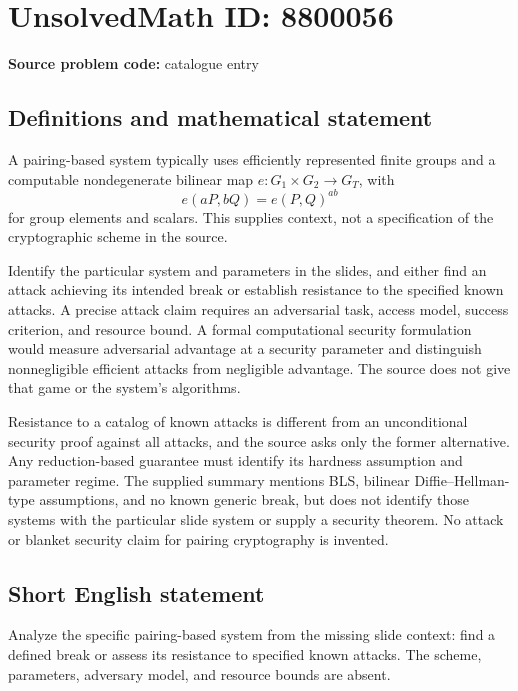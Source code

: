 \documentclass[11pt]{article}
\begin{document}
\section*{UnsolvedMath ID: 8800056}
\textbf{Source problem code:} catalogue entry
\subsection{Definitions and mathematical statement}
A pairing-based system typically uses efficiently represented finite groups and a computable nondegenerate bilinear map $e:G_1\times G_2\to G_T$, with
\[
e(aP,bQ)=e(P,Q)^{ab}
\]
for group elements and scalars. This supplies context, not a specification of the cryptographic scheme in the source.

Identify the particular system and parameters in the slides, and either find an attack achieving its intended break or establish resistance to the specified known attacks. A precise attack claim requires an adversarial task, access model, success criterion, and resource bound. A formal computational security formulation would measure adversarial advantage at a security parameter and distinguish nonnegligible efficient attacks from negligible advantage. The source does not give that game or the system's algorithms.

Resistance to a catalog of known attacks is different from an unconditional security proof against all attacks, and the source asks only the former alternative. Any reduction-based guarantee must identify its hardness assumption and parameter regime. The supplied summary mentions BLS, bilinear Diffie--Hellman-type assumptions, and no known generic break, but does not identify those systems with the particular slide system or supply a security theorem. No attack or blanket security claim for pairing cryptography is invented.
\subsection{Short English statement}
Analyze the specific pairing-based system from the missing slide context: find a defined break or assess its resistance to specified known attacks. The scheme, parameters, adversary model, and resource bounds are absent.
\end{document}
